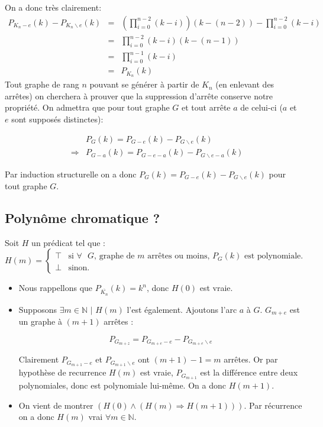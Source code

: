 On a donc très clairement:
\begin{eqnarray*}
P_{K_n-e}(k) -  P_{K_n\backslash e}(k) &=& (\prod_{i=0}^{n-2}(k-i))(k-(n-2)) - \prod_{i=0}^{n-2}(k-i)\\
&=& \prod_{i=0}^{n-2}(k-i)(k-(n-1))\\
&=& \prod_{i=0}^{n-1}(k-i)\\
&=& P_{K_n}(k)
\end{eqnarray*}
Tout graphe de rang $n$ pouvant se générer à partir de $K_n$ (en enlevant des arrêtes) on cherchera à prouver que la suppression d'arrête conserve notre propriété. On admettra que pour tout graphe $G$ et tout arrête $a$ de celui-ci ($a$ et $e$ sont supposés distinctes):

\begin{eqnarray*}
&&P_G(k) = P_{G-e}(k) - P_{G \backslash e}(k) \\
&\Rightarrow&  P_{G-a}(k) = P_{G-e-a}(k) - P_{G \backslash e-a}(k)
\end{eqnarray*}

Par induction structurelle on a donc $P_G(k) = P_{G-e}(k) - P_{G \backslash e}(k)$ pour tout graphe $G$.

\subsection{Polynôme chromatique ?}
Soit $H$ un prédicat tel que :
\begin{displaymath}
	H(m) = \left\{ \begin{array}{ll}
	\top & \textrm{si $\forall$ $G$, graphe de $m$ arrêtes ou moins, $P_G(k)$ est polynomiale.} \\
	\bot & \textrm{sinon.}
	\end{array} \right.
\end{displaymath} 
\begin{itemize} 
\item Nous rappellons que $P_{\overline{K_n}}(k)=k^n$, donc $H(0)$ est vraie. 
\item Supposons $\exists m \in \mathbb{N}$ $|$ $H(m)$ l'est également. Ajoutons l'arc $a$ à $G$. $G_{m+e}$ est un graphe à $(m+1)$ arrêtes :

\[ P_{G_{m+z}} = P_{G_{m+e}-e} - P_{G_{m+e} \backslash e} \]

Clairement $P_{G_{m+1}-e}$ et $P_{G_{m+1} \backslash e}$ ont $(m+1)-1 = m$ arrêtes. Or par hypothèse de recurrence $H(m)$ est vraie,
$P_{G_{m+1}}$ est la différence entre deux polynomiales, donc est polynomiale lui-même. On a donc $H(m+1)$.
\item On vient de montrer $(H(0) \wedge (H(m) \Rightarrow H(m+1)))$. Par récurrence on a donc $H(m)$ vrai $\forall m \in \mathbb{N}$. 

\end{itemize} 

